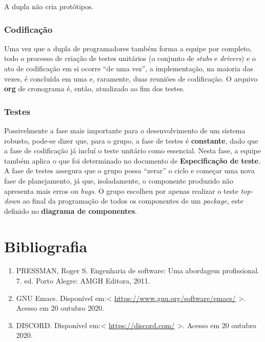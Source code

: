 \documentclass[11pt, a4paper]{article}
\begin{document}
A dupla não cria protótipos. 

\subsubsection{Codificação}
\label{sec:orgbc16847}
Uma vez que a dupla de programadores também forma a equipe por completo,
todo o processo de criação de testes unitários (o conjunto de \emph{stubs} e \emph{drivers})
e o ato de codificação em si ocorre ``de uma vez'', a implementação, na maioria das
vezes, é concluída em uma e, raramente, duas reuniões de codificação. O arquivo \textbf{org} de
cronograma é, então, atualizado ao fim dos testes.

\subsubsection{Testes}
\label{sec:org1aa3510}
Possivelmente a fase mais importante para o desenvolvimento de um sistema
robusto, pode-se dizer que, para o grupo, a fase de testes é \textbf{constante}, dado
que a fase de codificação já incluí o teste unitário como essencial. Nesta
fase, a equipe também aplica o que foi determinado no documento de
\textbf{Especificação de teste}. A fase de testes assegura que o grupo possa ``zerar''
o ciclo e começar uma nova fase de planejamento, já que, isoladamente, o
componente produzido não apresenta mais erros ou \emph{bugs}. O grupo escolheu
por apenas realizar o teste \emph{top-down} ao final da programação de todos
os componentes de um \emph{package}, este definido no \textbf{diagrama de componentes}.


\clearpage   
\section{Bibliografia}
\label{sec:org7296298}
\begin{enumerate}
\item \label{org376bcb0}
\label{sec:orgb6bc9f4}
PRESSMAN, Roger S. Engenharia de software: Uma abordagem profissional. 7. ed. Porto Alegre: AMGH Editora, 2011.
\item \label{orge0df9e4}
\label{sec:org4375ff5}
GNU Emacs. Disponível em:< \url{https://www.gnu.org/software/emacs/} >. Acesso em 20 outubro 2020.
\item \label{org2d92571}
\label{sec:org1d2e3c9}
DISCORD. Disponível em:< \url{https://discord.com/} >. Acesso em 20 outubro 2020.
\end{enumerate}
\end{document}
